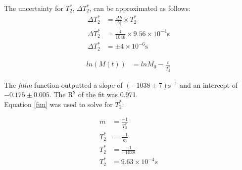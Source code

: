 The uncertainty for $T_{2}^*$, $\Delta T_{2}^*$, can be approximated as follows:
\begin{align*}
\Delta T_{2}^* &= \frac{\Delta b}{\left| b \right|} \times T_{2}^* \\
\Delta T_{2}^* &= \frac{4}{1046} \times 9.56 \times 10^{-4} \text{s} \\
\Delta T_{2}^* &= \pm 4 \times 10^{-6} \text{s}
\end{align*}



\begin{align}
\label{fun}
ln(M(t)) &= lnM_0 -\frac{t}{T_{2}^*}
\end{align}



The \textit{fitlm} function outputted a slope of $(-1038 \pm 7) \text{s}^{-1}$ and an intercept of $-0.175 \pm 0.005$. The $\text{R}^2$ of the fit was 0.971. \\

Equation \ref{fun} was used to solve for $T_{2}^*$:

\begin{align*}
m &= \frac{-1}{T_{2}^*} \\
T_{2}^* &= \frac{-1}{m} \\
T_{2}^* &= \frac{-1}{-1038} \\
T_{2}^* &= 9.63 \times 10^{-4} s \\
\end{align*}

